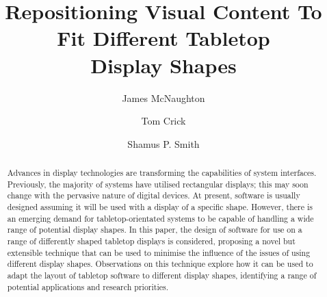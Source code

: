 \documentclass[review,5p,times,twocolumn]{elsarticle}
\begin{document}
\begin{frontmatter}



\title{Repositioning Visual Content To Fit Different Tabletop\\Display Shapes}


\author[durham]{James McNaughton}
\author[cardiff]{Tom Crick}
\author[newcastle]{Shamus P. Smith}


\address[durham]{Technology Enhanced Learning Special Interest Group,
  School of Education, Durham University, South Road, Durham DH1 3LE, UK}
\address[cardiff]{Department of Computing \& Information Systems,
  Cardiff Metropolitan University, Cardiff CF5 2YB, UK}
\address[newcastle]{School of Electrical Engineering and Computing, University of Newcastle, Callaghan NSW 2308, Australia}


\begin{abstract}
Advances in display technologies are transforming the capabilities of system interfaces.
Previously, the majority of systems have utilised rectangular
displays; this may soon change with the pervasive nature of digital devices.
At present, software is usually designed assuming it will be used with a display of a specific shape.
However, there is an emerging demand for tabletop-orientated systems
to be capable of handling a wide range of potential display shapes.
In this paper, the design of software for use on a range of
differently shaped tabletop displays is considered, proposing a novel
but extensible technique that can be used to minimise the influence of
the issues of using different display shapes.
Observations on this technique explore how it can be used to adapt the
layout of tabletop software to different display shapes, identifying a
range of potential applications and research priorities.
\end{abstract}



\end{frontmatter}
\end{document}
